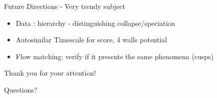\documentclass[aspectratio=169]{beamer}
\begin{document}
\begin{frame}{Future Directions - Very trendy subject}
    \begin{itemize}
        \item Data : hierarchy - distinguishing collapse/speciation
        \item Autosimilar Timescale for score, 4 walls potential
        \item Flow matching: verify if it presents the same phenomena (cusps)
    \end{itemize}
    
    \begin{center}
    \end{center}
\end{frame}



























\begin{frame}
    \centering
    \LARGE Thank you for your attention!
    
    \vspace{1cm}
    
    \large Questions?

    
    \begin{center}
    \end{center}

        
\end{frame}
\end{document}
